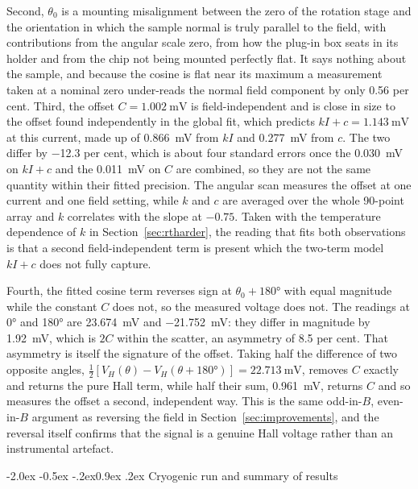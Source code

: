 \documentclass[11pt,a4paper]{article}
\makeatletter
\renewcommand\subsection{\@startsection{subsection}{2}{\z@}%
  {-2.0ex \@plus -0.5ex \@minus -.2ex}{0.9ex \@plus .2ex}%
  {\normalfont\normalsize\bfseries}}
\makeatother
\begin{document}
Second, $\theta_0$ is a mounting misalignment between the zero of the rotation stage and the
orientation in which the sample normal is truly parallel to the field, with contributions
from the angular scale zero, from how the plug-in box seats in its holder and from the chip
not being mounted perfectly flat. It says nothing about the sample, and because the cosine is
flat near its maximum a measurement taken at a nominal zero under-reads the normal field
component by only \num{0.56} per cent. Third, the offset $C = \qty{1.002}{\milli\volt}$ is
field-independent and is close in size to the offset found independently in the global fit,
which predicts $kI + c = \qty{1.143}{\milli\volt}$ at this current, made up of
\qty{0.866}{\milli\volt} from $kI$ and \qty{0.277}{\milli\volt} from $c$. The two differ by
\num{-12.3} per cent, which is about four standard errors once the \qty{0.030}{\milli\volt} on
$kI + c$ and the \qty{0.011}{\milli\volt} on $C$ are combined, so they are not the same
quantity within their fitted precision. The angular scan measures the offset at one current
and one field setting, while $k$ and $c$ are averaged over the whole \num{90}-point array and
$k$ correlates with the slope at $-0.75$. Taken with the temperature dependence of $k$ in
Section~\ref{sec:rtharder}, the reading that fits both observations is that a second
field-independent term is present which the two-term model $kI + c$ does not fully capture.

Fourth, the fitted cosine term reverses sign at $\theta_0 + \ang{180}$ with equal magnitude
while the constant $C$ does not, so the measured voltage does not. The readings at
\ang{0} and \ang{180} are \qty{+23.674}{\milli\volt} and \qty{-21.752}{\milli\volt}: they
differ in magnitude by \qty{1.92}{\milli\volt}, which is $2C$ within the scatter, an asymmetry
of \num{8.5} per cent. That asymmetry is itself the signature of the offset. Taking half the
difference of two opposite angles,
$\tfrac12\left[V_H(\theta)-V_H(\theta+\ang{180})\right] = \qty{22.713}{\milli\volt}$, removes
$C$ exactly and returns the pure Hall term, while half their sum,
\qty{0.961}{\milli\volt}, returns $C$ and so measures the offset a second, independent way.
This is the same odd-in-$B$, even-in-$B$ argument as reversing the field in
Section~\ref{sec:improvements}, and the reversal itself confirms that the signal is a genuine
Hall voltage rather than an instrumental artefact.

\subsection{Cryogenic run and summary of results}
\label{sec:results77}
\end{document}
